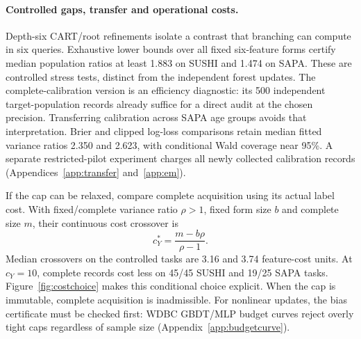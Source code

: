 \paragraph{Controlled gaps, transfer and operational costs.}
Depth-six CART/root refinements isolate a contrast that branching can
compute in six queries. Exhaustive lower bounds over all fixed six-feature
forms certify median population ratios at least 1.883 on SUSHI and 1.474
on SAPA. These are controlled stress tests, distinct from the independent
forest updates. The complete-calibration version is an efficiency
diagnostic: its 500 independent target-population records already suffice
for a direct audit at the chosen precision. Transferring calibration
across SAPA age groups avoids that interpretation. Brier and clipped
log-loss comparisons retain median fitted variance ratios 2.350 and 2.623,
with conditional Wald coverage near 95\%. A separate restricted-pilot
experiment charges all newly collected calibration records
(Appendices~\ref{app:transfer} and~\ref{app:em}).

If the cap can be relaxed, compare complete acquisition using its actual
label cost. With fixed/complete variance ratio $\rho>1$, fixed form size
$b$ and complete size $m$, their continuous cost crossover is
\begin{equation}
 c_Y^*=\frac{m-b\rho}{\rho-1}.\label{eq:costcross}
\end{equation}
Median crossovers on the controlled tasks are 3.16 and 3.74 feature-cost
units. At $c_Y=10$, complete records cost less on 45/45 SUSHI and 19/25
SAPA tasks. Figure~\ref{fig:costchoice} makes this conditional choice
explicit. When the cap is immutable, complete acquisition is inadmissible.
For nonlinear updates, the bias certificate must be checked first:
WDBC GBDT/MLP budget curves reject overly tight caps regardless of sample
size (Appendix~\ref{app:budgetcurve}).
